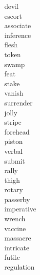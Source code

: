 \documentclass[a4paper, 11pt]{ctexart}
\begin{document}
\begin{multicols*}{3}
\begin{description}
\item[devil]

\item[escort]

\item[associate]

\item[inference]

\item[flesh]

\item[token]

\item[swamp]

\item[feat]

\item[stake]

\item[vanish]

\item[surrender]

\item[jolly]

\item[stripe]

\item[forehead]

\item[piston]

\item[verbal]

\item[submit]

\item[rally]

\item[thigh]

\item[rotary]

\item[passerby]

\item[imperative]

\item[wrench]

\item[vaccine]

\item[massacre]

\item[intricate]

\item[futile]

\item[regulation]


\end{description}
\end{multicols*}
\end{document}
